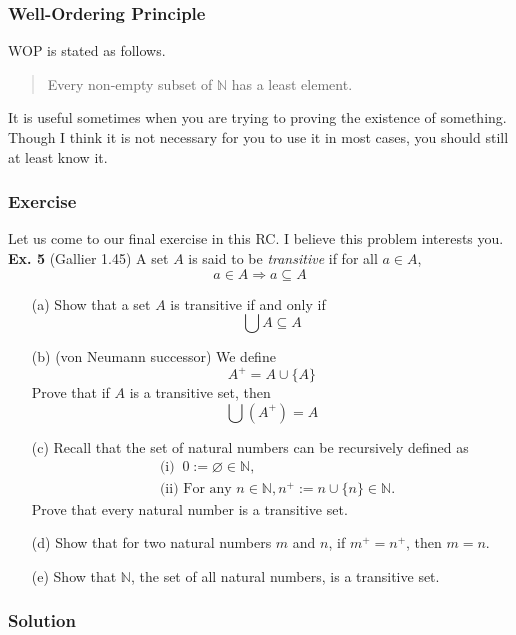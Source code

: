 \documentclass[aspectratio=169]{beamer}
\begin{document}
\begin{frame}
  \frametitle{Well-Ordering Principle}
  WOP is stated as follows.
  \begin{quotation}
    Every non-empty subset of $\mathbb{N}$ has a least element.
  \end{quotation}
  It is useful sometimes when you are trying to proving the existence of something. Though I think it is 
  not necessary for you to use it in most cases, you should still at least know it. 
\end{frame}
\begin{frame}
  \frametitle{Exercise}
  Let us come to our final exercise in this RC. I believe this problem interests you. \\
  \textbf{Ex. 5} (Gallier 1.45) A set $A$ is said to be \textit{transitive} if for all $a\in A$, 
  \begin{equation*}
      a\in A \Rightarrow a\subseteq A
  \end{equation*}
  \begin{itemize}
      \item[(a)] Show that a set $A$ is transitive if and only if
      \begin{equation*}
          \bigcup A \subseteq A
      \end{equation*}
      \item[(b)](von Neumann successor) We define
      \begin{equation*}
          A^+ = A\cup \{A\}
      \end{equation*}
      Prove that if $A$ is a transitive set, then
      \begin{equation*}
          \bigcup \left(A^+\right) = A
      \end{equation*}
  \end{itemize}
\end{frame}
\begin{frame}
  \begin{itemize}
      \item[(c)] Recall that the set of natural numbers can be recursively defined as
      \begin{align*}
          &\mbox{(i) }\ 0 := \varnothing \in \mathbb{N}, \\
          &\mbox{(ii) For any } n \in \mathbb{N}, n^+ := n\cup \{n\} \in \mathbb{N}.
      \end{align*}
      Prove that every natural number is a transitive set.
      \item[(d)] Show that for two natural numbers $m$ and $n$, if $m^+ = n^+$, then $m = n$.
      \item[(e)] Show that $\mathbb{N}$, the set of all natural numbers, is a transitive set. 
  \end{itemize}
\end{frame}
\begin{frame}
  \frametitle{Solution}
\end{frame}
\end{document}
